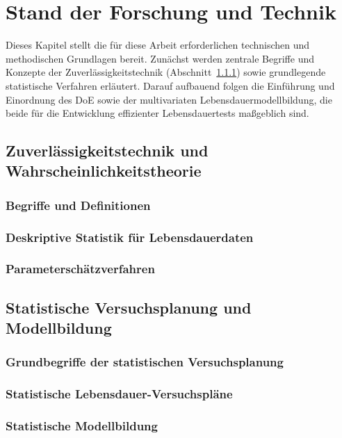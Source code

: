 
\chapter{Stand der Forschung und Technik} \label{chap.Std}

Dieses Kapitel stellt die für diese Arbeit erforderlichen technischen und methodischen Grundlagen bereit. Zunächst werden zentrale Begriffe und Konzepte der Zuverlässigkeitstechnik (Abschnitt~\ref{subsec.BegriffeZUV}) sowie grundlegende statistische Verfahren erläutert. Darauf aufbauend folgen die Einführung und Einordnung des \acs{DoE} sowie der multivariaten Lebensdauermodellbildung, die beide für die Entwicklung effizienter Lebensdauertests maßgeblich sind. \cite{colu92}

\section{Zuverlässigkeitstechnik und Wahrscheinlichkeitstheorie} \label{sec.Zuv}
\subsection{Begriffe und Definitionen} \label{subsec.BegriffeZUV}
\subsection{Deskriptive Statistik für Lebensdauerdaten} \label{subsec.Stat}
\subsection{Parameterschätzverfahren} \label{subsec.Schätzer}
\section{Statistische Versuchsplanung und Modellbildung} \label{sec.DoE}
\subsection{Grundbegriffe der statistischen Versuchsplanung} \label{subsec.BegriffeDoE}
\subsection{Statistische Lebensdauer-Versuchspläne} \label{subsec.Pläne}
\subsection{Statistische Modellbildung} \label{subsec.Model}
